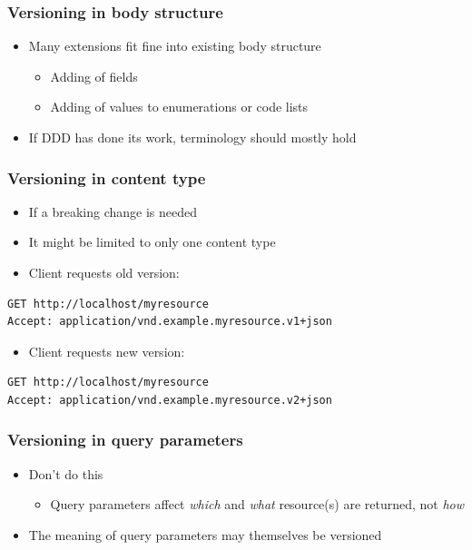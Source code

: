 \documentclass[8pt]{article}
\begin{document}
\subsubsection{Versioning in body structure}
\label{sec:orge906308}
\begin{itemize}
\item Many extensions fit fine into existing body structure
\begin{itemize}
\item Adding of fields
\item Adding of values to enumerations or code lists
\end{itemize}
\item If DDD has done its work, terminology should mostly hold
\end{itemize}
\subsubsection{Versioning in content type}
\label{sec:orgd932910}
\begin{itemize}
\item If a breaking change is needed
\item It might be limited to only one content type
\item Client requests old version:
\end{itemize}
\begin{verbatim}
GET http://localhost/myresource
Accept: application/vnd.example.myresource.v1+json
\end{verbatim}
\begin{itemize}
\item Client requests new version:
\end{itemize}
\begin{verbatim}
GET http://localhost/myresource
Accept: application/vnd.example.myresource.v2+json
\end{verbatim}
\subsubsection{Versioning in query parameters}
\label{sec:org7a4879a}
\begin{itemize}
\item Don't do this
\begin{itemize}
\item Query parameters affect \emph{which} and \emph{what} resource(s) are returned, not \emph{how}
\end{itemize}
\item The meaning of query parameters may themselves be versioned
\end{itemize}
\end{document}
